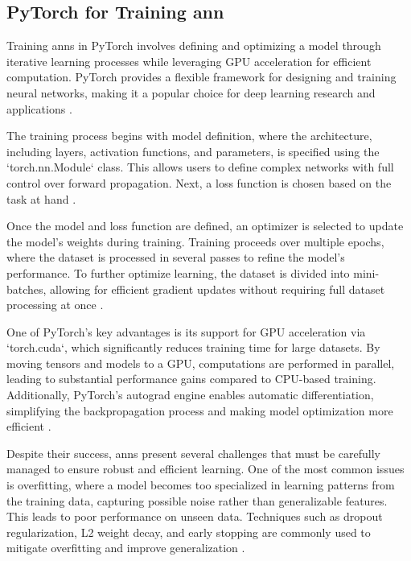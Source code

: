 \subsection{PyTorch for Training \ac{ann}} \label{sec:pytorch}

Training \ac{ann}s in PyTorch involves defining and optimizing a model through iterative learning processes while leveraging GPU acceleration for efficient computation.
PyTorch provides a flexible framework for designing and training neural networks, making it a popular choice for deep learning research and applications \cite{pytorchPyTorch}.

The training process begins with model definition, where the architecture, including layers, activation functions, and parameters, is specified using the `torch.nn.Module` class.
This allows users to define complex networks with full control over forward propagation.
Next, a loss function is chosen based on the task at hand \cite{pytorchPyTorch}.

Once the model and loss function are defined, an optimizer is selected to update the model’s weights during training.
Training proceeds over multiple epochs, where the dataset is processed in several passes to refine the model’s performance.
To further optimize learning, the dataset is divided into mini-batches, allowing for efficient gradient updates without requiring full dataset processing at once \cite{pytorchPyTorch}.

One of PyTorch’s key advantages is its support for GPU acceleration via `torch.cuda`, which significantly reduces training time for large datasets.
By moving tensors and models to a GPU, computations are performed in parallel, leading to substantial performance gains compared to CPU-based training.
Additionally, PyTorch's autograd engine enables automatic differentiation, simplifying the backpropagation process and making model optimization more efficient \cite{pytorchPyTorch}.

Despite their success, \ac{ann}s present several challenges that must be carefully managed to ensure robust and efficient learning.
One of the most common issues is overfitting, where a model becomes too specialized in learning patterns from the training data, capturing possible noise rather than generalizable features.
This leads to poor performance on unseen data.
Techniques such as dropout regularization, L2 weight decay, and early stopping are commonly used to mitigate overfitting and improve generalization \cite{pytorchPyTorch,glorot2010understanding}.

